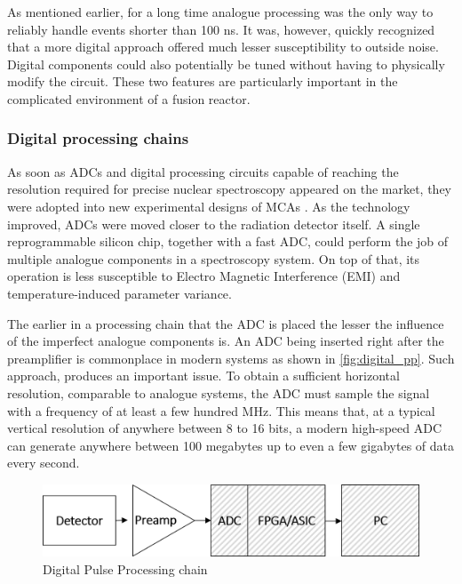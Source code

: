 As mentioned earlier, for a long time analogue processing 
was the only way to reliably handle events shorter than 100 ns. 
It was, however, quickly recognized
that a more digital approach offered 
much lesser susceptibility to outside noise. 
Digital components could also potentially be tuned without
having to physically modify the circuit.
These two features are particularly important in the 
complicated environment of a fusion reactor.
\cite{analog_vs_digital_1998}

\subsubsection{Digital processing chains}

As soon as ADCs and digital processing circuits capable of
reaching the resolution required for precise nuclear
spectroscopy appeared on the market, they were 
adopted into new experimental designs of MCAs \cite{mca_fpga}.
As the technology improved, ADCs were moved closer to the 
radiation detector itself.
A single reprogrammable silicon chip, together with a fast ADC,
could perform the job of multiple analogue components
in a spectroscopy system.
On top of that, its operation is less susceptible to Electro Magnetic
Interference (EMI) and temperature-induced parameter variance.
\cite{dpp_walewski}


The earlier in a processing chain that the ADC is placed the
lesser the influence of the imperfect analogue components is.
An ADC being inserted right after the preamplifier is commonplace
in modern systems as shown in \autoref{fig:digital_pp}.
Such approach, produces an important issue.
To obtain a sufficient horizontal resolution, comparable to analogue systems,
the ADC must sample the signal with a frequency of at least
a few hundred MHz. This means that, at a typical vertical resolution
of anywhere between 8 to 16 bits, a modern high-speed ADC
can generate anywhere between 100 megabytes 
up to even a few gigabytes of data every second.
\cite{dpp_walewski}

\begin{figure}[H]
  \centering
  \includegraphics[width=.7\linewidth]{media/digital_pulse_processing.png}
  \caption{Digital Pulse Processing chain}
  \label{fig:digital_pp}
\end{figure}

